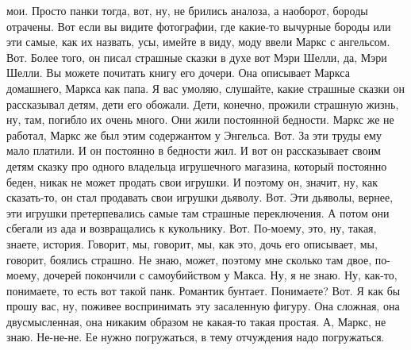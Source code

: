 мои. Просто панки тогда, вот, ну, не брились аналоза, а наоборот, бороды
отрачены. Вот если вы видите фотографии, где какие-то вычурные бороды или эти
самые, как их назвать, усы, имейте в виду, моду ввели Маркс с ангельсом. Вот.
Более того, он писал страшные сказки в духе вот Мэри Шелли, да, Мэри Шелли. Вы
можете почитать книгу его дочери. Она описывает Маркса домашнего, Маркса как
папа. Я вас умоляю, слушайте, какие страшные сказки он рассказывал детям, дети
его обожали. Дети, конечно, прожили страшную жизнь, ну, там, погибло их очень
много. Они жили постоянной бедности. Маркс же не работал, Маркс же был этим
содержантом у Энгельса. Вот. За эти труды ему мало платили. И он постоянно в
бедности жил. И вот он рассказывает своим детям сказку про одного владельца
игрушечного магазина, который постоянно беден, никак не может продать свои
игрушки. И поэтому он, значит, ну, как сказать-то, он стал продавать свои
игрушки дьяволу. Вот. Эти дьяволы, вернее, эти игрушки претерпевались самые там
страшные переключения. А потом они сбегали из ада и возвращались к кукольнику.
Вот. По-моему, это, ну, такая, знаете, история. Говорит, мы, говорит, мы, как
это, дочь его описывает, мы, говорит, боялись страшно. Не знаю, может, поэтому
мне сколько там двое, по-моему, дочерей покончили с самоубийством у Макса. Ну, я
не знаю. Ну, как-то, понимаете, то есть вот такой панк. Романтик бунтает.
Понимаете? Вот. Я как бы прошу вас, ну, поживее воспринимать эту засаленную
фигуру. Она сложная, она двусмысленная, она никаким образом не какая-то такая
простая. А, Маркс, не знаю. Не-не-не. Ее нужно погружаться, в тему отчуждения
надо погружаться.

